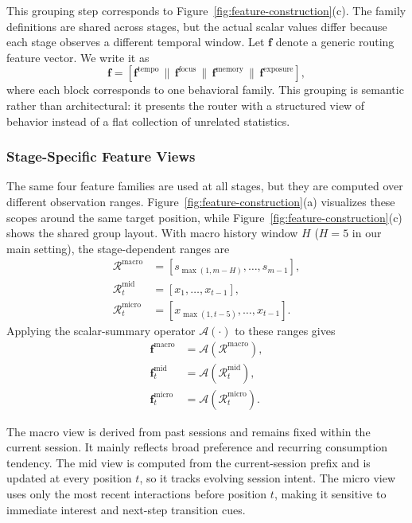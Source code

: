 \documentclass[sigconf,anonymous,review]{acmart}
\begin{document}
This grouping step corresponds to Figure~\ref{fig:feature-construction}(c). The family definitions are shared across stages, but the actual scalar values differ because each stage observes a different temporal window. Let $\mathbf{f}$ denote a generic routing feature vector. We write it as
\[
\mathbf{f}
=
[\mathbf{f}^{\mathrm{tempo}} \,\|\, \mathbf{f}^{\mathrm{focus}} \,\|\, \mathbf{f}^{\mathrm{memory}} \,\|\, \mathbf{f}^{\mathrm{exposure}}],
\]
where each block corresponds to one behavioral family. This grouping is semantic rather than architectural: it presents the router with a structured view of behavior instead of a flat collection of unrelated statistics.

\subsubsection{Stage-Specific Feature Views}

The same four feature families are used at all stages, but they are computed over different observation ranges. Figure~\ref{fig:feature-construction}(a) visualizes these scopes around the same target position, while Figure~\ref{fig:feature-construction}(c) shows the shared group layout. With macro history window $H$ ($H=5$ in our main setting), the stage-dependent ranges are
\begin{align}
\mathcal{R}^{\mathrm{macro}} &= [s_{\max(1,m-H)}, \dots, s_{m-1}], \\
\mathcal{R}^{\mathrm{mid}}_t &= [x_1, \dots, x_{t-1}], \\
\mathcal{R}^{\mathrm{micro}}_t &= [x_{\max(1,t-5)}, \dots, x_{t-1}].
\end{align}
Applying the scalar-summary operator $\mathcal{A}(\cdot)$ to these ranges gives
\begin{align}
\mathbf{f}^{\mathrm{macro}} &= \mathcal{A}(\mathcal{R}^{\mathrm{macro}}), \\
\mathbf{f}^{\mathrm{mid}}_t &= \mathcal{A}(\mathcal{R}^{\mathrm{mid}}_t), \\
\mathbf{f}^{\mathrm{micro}}_t &= \mathcal{A}(\mathcal{R}^{\mathrm{micro}}_t).
\end{align}

The macro view is derived from past sessions and remains fixed within the current session. It mainly reflects broad preference and recurring consumption tendency. The mid view is computed from the current-session prefix and is updated at every position $t$, so it tracks evolving session intent. The micro view uses only the most recent interactions before position $t$, making it sensitive to immediate interest and next-step transition cues.
\end{document}
